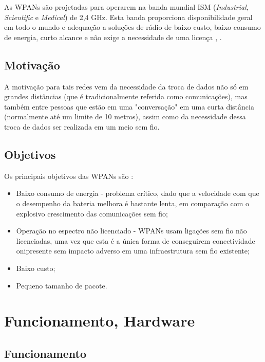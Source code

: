 \documentclass[conference]{IEEEtran}
\begin{document}
As WPANs são projetadas para operarem na banda mundial ISM (\textit{Industrial}, \textit{Scientific} e \textit{Medical}) de 2,4 GHz. Esta banda proporciona disponibilidade geral em todo o mundo e adequação a soluções de rádio de baixo custo, baixo consumo de energia, curto alcance e não exige a necessidade de uma licença \cite{marsan2002optimizing}, \cite{braley2000wireless}.


\subsection{Motivação}

A motivação para tais redes vem da necessidade da troca de dados não só em grandes distâncias (que é tradicionalmente referida como comunicações), mas também entre pessoas que estão em uma "conversação" em uma curta distância (normalmente até um limite de 10 metros), assim como da necessidade dessa troca de dados ser realizada em um meio sem fio.


\subsection{Objetivos}

Os principais objetivos das WPANs são \cite{prasad2004ofdm}:

\begin{itemize}

 \item Baixo consumo de energia - problema crítico, dado que a velocidade com que o desempenho da bateria melhora é bastante lenta, em comparação com o explosivo crescimento das comunicações sem fio;
 \item Operação no espectro não licenciado - WPANs usam ligações sem fio não licenciadas, uma vez que esta é a única forma de conseguirem conectividade onipresente sem impacto adverso em uma infraestrutura sem fio existente;
 \item Baixo custo;
 \item Pequeno tamanho de pacote.
 
\end{itemize}


\section{Funcionamento, Hardware} \label{func_hard}

\subsection{Funcionamento}
\end{document}
